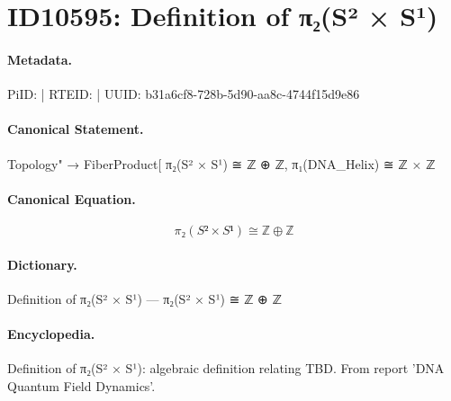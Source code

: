 \section*{ID10595: Definition of π₂(S² × S¹)}
\paragraph{Metadata.}
PiID:  | RTEID:  | UUID: b31a6cf8-728b-5d90-aa8c-4744f15d9e86

\paragraph{Canonical Statement.}
Topology" → FiberProduct[ π₂(S² × S¹) ≅ ℤ ⊕ ℤ, π₁(DNA\_Helix) ≅ ℤ × ℤ

\paragraph{Canonical Equation.}
\[
π₂(S² × S¹) ≅ ℤ ⊕ ℤ
\]

\paragraph{Dictionary.}
Definition of π₂(S² × S¹) — π₂(S² × S¹) ≅ ℤ ⊕ ℤ

\paragraph{Encyclopedia.}
Definition of π₂(S² × S¹): algebraic definition relating TBD. From report 'DNA Quantum Field Dynamics'.
